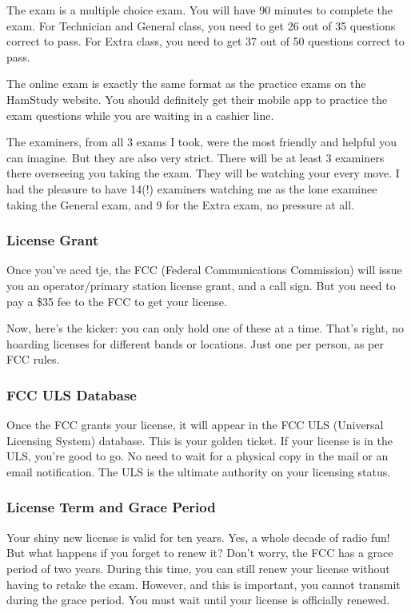 The exam is a multiple choice exam. You will have 90 minutes to complete the exam. For Technician and General class, you need to get 26  out of 35 questions correct to pass. For Extra class, you need to get 37 out of 50 questions correct to pass. 

The online exam is exactly the same format as the practice exams on the HamStudy website. You should definitely get their mobile app to practice the exam questions while you are waiting in a cashier line. 

The examiners, from all 3 exams I took, were the most friendly and helpful you can imagine. But they are also very strict. There will be at least 3 examiners there  overseeing you taking the exam. They will be watching your every move. I had the pleasure to have 14(!) examiners watching me as the lone examinee taking the General exam, and 9 for the Extra exam, no pressure at all. 


\subsubsection{License Grant}
Once you've aced tje, the FCC (Federal Communications Commission) will issue you an operator/primary station license grant, and a call sign. But you need to pay a \$35 fee to the FCC to get your license. 

Now, here's the kicker: you can only hold one of these at a time. That's right, no hoarding licenses for different bands or locations. Just one per person, as per FCC rules.


\subsubsection{FCC ULS Database}
Once the FCC grants your license, it will appear in the FCC ULS (Universal Licensing System) database. This is your golden ticket. If your license is in the ULS, you're good to go. No need to wait for a physical copy in the mail or an email notification. The ULS is the ultimate authority on your licensing status.

\subsubsection*{License Term and Grace Period}
Your shiny new license is valid for ten years. Yes, a whole decade of radio fun! But what happens if you forget to renew it? Don't worry, the FCC has a grace period of two years. During this time, you can still renew your license without having to retake the exam. However, and this is important, you cannot transmit during the grace period. You must wait until your license is officially renewed.

